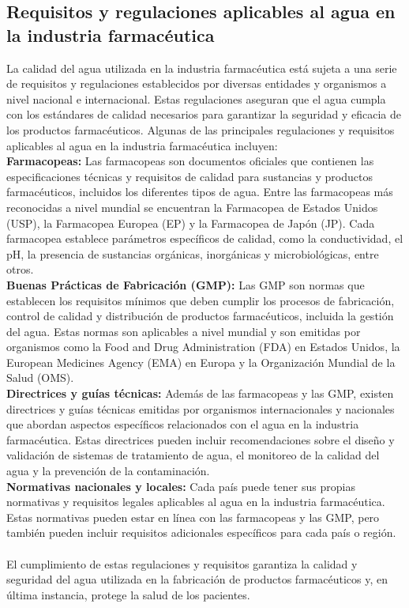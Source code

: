 \subsection{ Requisitos y regulaciones aplicables al agua en la industria farmacéutica}

La calidad del agua utilizada en la industria farmacéutica está sujeta a una serie de requisitos y regulaciones establecidos por diversas entidades y organismos a nivel nacional e internacional. Estas regulaciones aseguran que el agua cumpla con los estándares de calidad necesarios para garantizar la seguridad y eficacia de los productos farmacéuticos. Algunas de las principales regulaciones y requisitos aplicables al agua en la industria farmacéutica incluyen:\\ 

\textbf{Farmacopeas:} Las farmacopeas son documentos oficiales que contienen las especificaciones técnicas y requisitos de calidad para sustancias y productos farmacéuticos, incluidos los diferentes tipos de agua. Entre las farmacopeas más reconocidas a nivel mundial se encuentran la Farmacopea de Estados Unidos (USP), la Farmacopea Europea (EP) y la Farmacopea de Japón (JP). Cada farmacopea establece parámetros específicos de calidad, como la conductividad, el pH, la presencia de sustancias orgánicas, inorgánicas y microbiológicas, entre otros. \\ 

\textbf{ Buenas Prácticas de Fabricación (GMP):} Las GMP son normas que establecen los requisitos mínimos que deben cumplir los procesos de fabricación, control de calidad y distribución de productos farmacéuticos, incluida la gestión del agua. Estas normas son aplicables a nivel mundial y son emitidas por organismos como la Food and Drug Administration (FDA) en Estados Unidos, la European Medicines Agency (EMA) en Europa y la Organización Mundial de la Salud (OMS).\\ 

\textbf{ Directrices y guías técnicas:} Además de las farmacopeas y las GMP, existen directrices y guías técnicas emitidas por organismos internacionales y nacionales que abordan aspectos específicos relacionados con el agua en la industria farmacéutica. Estas directrices pueden incluir recomendaciones sobre el diseño y validación de sistemas de tratamiento de agua, el monitoreo de la calidad del agua y la prevención de la contaminación.\\ 

\textbf{ Normativas nacionales y locales:} Cada país puede tener sus propias normativas y requisitos legales aplicables al agua en la industria farmacéutica. Estas normativas pueden estar en línea con las farmacopeas y las GMP, pero también pueden incluir requisitos adicionales específicos para cada país o región.\\\\ 


El cumplimiento de estas regulaciones y requisitos garantiza la calidad y seguridad del agua utilizada en la fabricación de productos farmacéuticos y, en última instancia, protege la salud de los pacientes.
